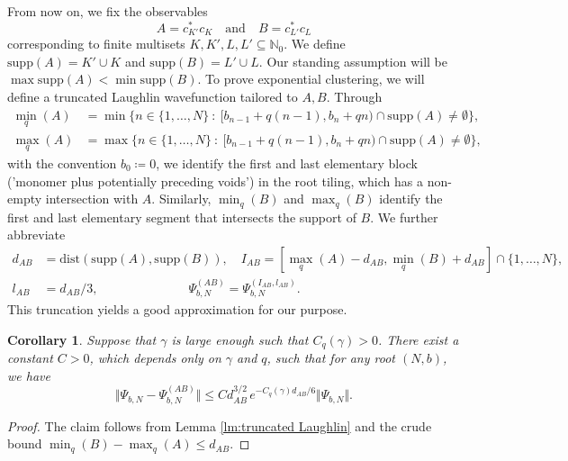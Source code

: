 \documentclass[letterpaper, DIV=17]{scrartcl}
\newtheorem{cor}[theorem]{Corollary}
\numberwithin{equation}{section}
\theoremstyle{definition}
\begin{document}
From now on, we fix the observables 
$$A=c_{K'}^* c_K \quad \mbox{and}\quad  B=c_{L'}^* c_L$$ 
corresponding to finite multisets $K,K', L,L'\subseteq \mathbb{N}_0$. We define $\mathrm{supp}(A)=K'\cup K$ and $\mathrm{supp}(B)= L'\cup L$. Our standing assumption will be $\max \mathrm{supp}(A)  < \min \mathrm{supp}(B)$. To prove exponential clustering, we will define a truncated Laughlin wavefunction tailored to $A,B$. Through
\begin{equation}
	\begin{split}
		\textstyle \min_q(A) &= \min \{n\in \{1, \dots, N\} \ : \ [b_{n-1}+q(n-1), b_{n}+qn ) \cap \mathrm{supp}(A) \neq \emptyset \}, \\
		\textstyle \max_q(A) &= \max \{n\in \{1, \dots, N\} \ : \ [b_{n-1}+q(n-1), b_n+qn )\cap \mathrm{supp}(A) \neq \emptyset \},
	\end{split}
\end{equation}
with the convention $ b_0 \coloneqq 0 $, we identify the first and last elementary block ('monomer plus potentially preceding voids') in the root tiling, which has a non-empty intersection with $ A $. Similarly, $\min_q(B)$ and $\max_q(B)$ identify the first and last elementary segment that intersects the support of $ B $. We further abbreviate
\begin{equation}
	\begin{split}
		d_{AB} &= \mathrm{dist}(\mathrm{supp}(A), \mathrm{supp}(B)),	\quad	I_{AB} = [ \textstyle \max_q(A)-d_{AB}, \textstyle \min_q(B)+d_{AB}] \cap \{1, \dots, N\}, \\ 
		l_{AB} &= d_{AB}/3, \hspace{3cm} \Psi_{b,N}^{(AB)} = \Psi_{b,N}^{(I_{AB}, l_{AB})}.
	\end{split}
\end{equation}
This truncation yields a good approximation for our purpose. 
\begin{cor} \label{cor:difference norm truncation}
	Suppose that $\gamma$ is large enough such that $C_q(\gamma)>0$. There exist a constant $C>0$, which depends only on $\gamma$ and $q$, such that for any root  $(N,b)$, we have 	
	\begin{equation}
		\Vert \Psi_{b,N} - \Psi_{b,N}^{(AB)}\Vert \leq C d_{AB}^{3/2} \, e^{-C_q(\gamma) d_{AB}/6} \Vert \Psi_{b,N} \Vert.
	\end{equation}
\end{cor}
\begin{proof}
	The claim follows from Lemma \ref{lm:truncated Laughlin} and the crude bound $\min_q(B)-\max_q(A)\leq d_{AB}$.
\end{proof}
\end{document}
